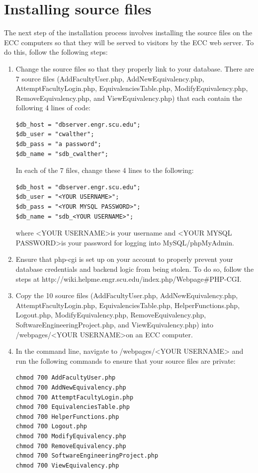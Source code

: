 \documentclass{article}
\begin{document}
\section{Installing source files}
\par The next step of the installation process involves installing the source
files on the ECC computers so that they will be served to visitors by the ECC
web server.  To do this, follow the following steps:
\begin{enumerate}
\item Change the source files so that they properly link to your database.
There are 7 source files (AddFacultyUser.php, AddNewEquivalency.php,
AttemptFacultyLogin.php, EquivalenciesTable.php, ModifyEquivalency.php,
RemoveEquivalency.php, and ViewEquivalency.php) that each contain the following 4
lines of code:
\begin{lstlisting}
$db_host = "dbserver.engr.scu.edu";
$db_user = "cwalther";
$db_pass = "a password";
$db_name = "sdb_cwalther";
\end{lstlisting}
In each of the 7 files, change these 4 lines to the following:
\begin{lstlisting}
$db_host = "dbserver.engr.scu.edu";
$db_user = "<YOUR USERNAME>";
$db_pass = "<YOUR MYSQL PASSWORD>";
$db_name = "sdb_<YOUR USERNAME>";
\end{lstlisting}
where \textless YOUR USERNAME\textgreater  is your username and \textless YOUR
MYSQL PASSWORD\textgreater  is your
password for logging into MySQL/phpMyAdmin.
\item Ensure that php-cgi is set up on your account to properly prevent your
database credentials and backend logic from being stolen.  To do so, follow the
steps at \newline http://wiki.helpme.engr.scu.edu/index.php/Webpage\#PHP-CGI.
\item Copy the 10 source files
(AddFacultyUser.php, AddNewEquivalency.php, AttemptFacultyLogin.php,
EquivalenciesTable.php, HelperFunctions.php, Logout.php, ModifyEquivalency.php,
RemoveEquivalency.php, SoftwareEngineeringProject.php, and ViewEquivalency.php)
into /webpages/\textless YOUR USERNAME\textgreater  on an ECC computer.
\item In the command line, navigate to /webpages/\textless YOUR USERNAME\textgreater
and run the
following commands to ensure that your source files are private:
\begin{lstlisting}
chmod 700 AddFacultyUser.php
chmod 700 AddNewEquivalency.php
chmod 700 AttemptFacultyLogin.php
chmod 700 EquivalenciesTable.php
chmod 700 HelperFunctions.php
chmod 700 Logout.php
chmod 700 ModifyEquivalency.php
chmod 700 RemoveEquivalency.php
chmod 700 SoftwareEngineeringProject.php
chmod 700 ViewEquivalency.php
\end{lstlisting}
\end{enumerate}
\end{document}
